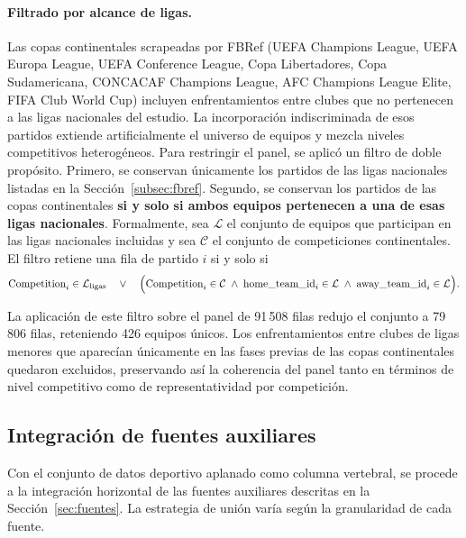 \paragraph{Filtrado por alcance de ligas.} Las copas continentales scrapeadas por FBRef (UEFA Champions League, UEFA Europa League, UEFA Conference League, Copa Libertadores, Copa Sudamericana, CONCACAF Champions League, AFC Champions League Elite, FIFA Club World Cup) incluyen enfrentamientos entre clubes que no pertenecen a las ligas nacionales del estudio. La incorporaci\'on indiscriminada de esos partidos extiende artificialmente el universo de equipos y mezcla niveles competitivos heterog\'eneos. Para restringir el panel, se aplic\'o un filtro de doble prop\'osito. Primero, se conservan \'unicamente los partidos de las ligas nacionales listadas en la Secci\'on~\ref{subsec:fbref}. Segundo, se conservan los partidos de las copas continentales \textbf{si y solo si ambos equipos pertenecen a una de esas ligas 	nacionales}. Formalmente, sea $\mathcal{L}$ el conjunto de equipos que participan en las ligas nacionales incluidas y sea $\mathcal{C}$ el conjunto de competiciones continentales. El filtro retiene una fila de partido $i$ si y solo si
\begin{equation*}
	\text{Competition}_i \in \mathcal{L}_{\text{ligas}} 
	\quad\vee\quad 
	\Bigl( \text{Competition}_i \in \mathcal{C} 
	\;\wedge\; 
	\text{home\_team\_id}_i \in \mathcal{L} 
	\;\wedge\; 
	\text{away\_team\_id}_i \in \mathcal{L} 
	\Bigr).
\end{equation*}

La aplicaci\'on de este filtro sobre el panel de 91\,508 filas redujo el conjunto a 79\,806 filas, reteniendo 426 equipos \'unicos. Los enfrentamientos entre clubes de ligas menores que aparec\'ian \'unicamente en las fases previas de las copas continentales quedaron excluidos, preservando as\'i la coherencia del panel tanto en t\'erminos de nivel competitivo como de representatividad por competici\'on.

\subsection{Integraci\'on de fuentes auxiliares}
\label{subsec:integracion}

Con el conjunto de datos deportivo aplanado como columna vertebral, se procede a la integraci\'on horizontal de las fuentes auxiliares descritas en la Secci\'on~\ref{sec:fuentes}. La estrategia de uni\'on var\'ia seg\'un la granularidad de cada fuente.

